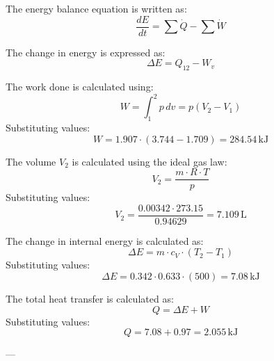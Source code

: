 The energy balance equation is written as:  
\[
\frac{dE}{dt} = \sum \dot{Q} - \sum \dot{W}
\]  

The change in energy is expressed as:  
\[
\Delta E = Q_{12} - W_v
\]  

The work done is calculated using:  
\[
W = \int_{1}^{2} p \, dv = p(V_2 - V_1)
\]  
Substituting values:  
\[
W = 1.907 \cdot (3.744 - 1.709) = 284.54 \, \text{kJ}
\]  

The volume \( V_2 \) is calculated using the ideal gas law:  
\[
V_2 = \frac{m \cdot R \cdot T}{p}
\]  
Substituting values:  
\[
V_2 = \frac{0.00342 \cdot 273.15}{0.94629} = 7.109 \, \text{L}
\]  

The change in internal energy is calculated as:  
\[
\Delta E = m \cdot c_V \cdot (T_2 - T_1)
\]  
Substituting values:  
\[
\Delta E = 0.342 \cdot 0.633 \cdot (500) = 7.08 \, \text{kJ}
\]  

The total heat transfer is calculated as:  
\[
Q = \Delta E + W
\]  
Substituting values:  
\[
Q = 7.08 + 0.97 = 2.055 \, \text{kJ}
\]  

---